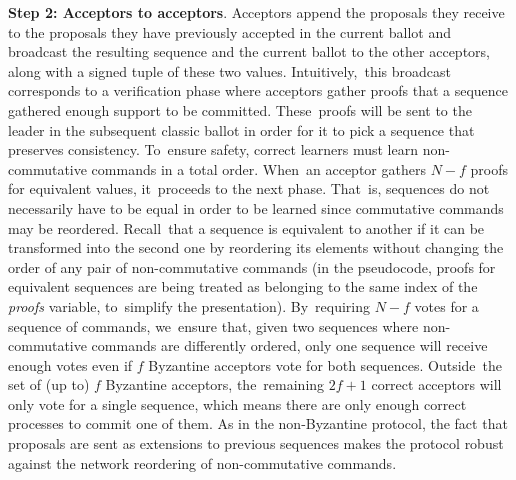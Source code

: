\documentclass[algorithms,article,accept,moreauthors,pdftex,10pt,a4paper]{Definitions/mdpi}
\begin{document}
{\bf Step 2: Acceptors to acceptors}.
Acceptors append the proposals they receive to the proposals they have previously accepted in the current ballot and broadcast the resulting sequence and the current ballot to the other acceptors, along with a signed tuple of these two values. Intuitively,~this broadcast corresponds to a verification phase where acceptors gather proofs that a sequence gathered enough support to be committed. These~proofs will be sent to the leader in the subsequent classic ballot in order for it to pick a sequence that preserves consistency. To~ensure safety, correct learners must learn non-commutative commands in a total order. When~an acceptor gathers $N-f$ proofs for equivalent values, it~proceeds to the next phase. That~is, sequences do not necessarily have to be equal in order to be learned since commutative commands may be reordered. Recall~that a sequence is equivalent to another if it can be transformed into the second one by reordering its elements without changing the order of any pair of non-commutative commands (in the pseudocode, proofs for equivalent sequences are being treated as belonging to the same index of the \emph{proofs} variable, to~simplify the presentation). By~requiring $N-f$ votes for a sequence of commands, we~ensure that, given two sequences where non-commutative commands are differently ordered, only one sequence will receive enough votes even if $f$ Byzantine acceptors vote for both sequences. Outside~the set of (up to) $f$ Byzantine acceptors, the~remaining $2f+1$ correct acceptors will only vote for a single sequence, which means there are only enough correct processes to commit one of them. As in the non-Byzantine protocol, the fact that proposals are sent as extensions to previous sequences makes the protocol robust against the network reordering of non-commutative commands. 
\end{document}
